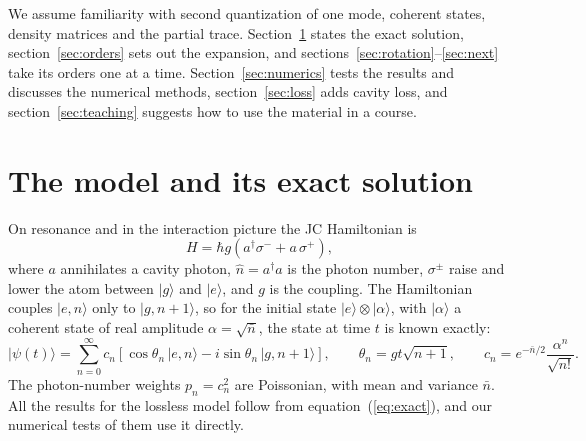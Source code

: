 \documentclass{iopjournal}
\newcommand{\nbar}{\bar{n}}
\newcommand{\ket}[1]{|#1\rangle}
\begin{document}
We assume familiarity with second quantization of one mode, coherent states, density matrices and the partial trace. Section~\ref{sec:model} states the exact solution, section~\ref{sec:orders} sets out the expansion, and sections~\ref{sec:rotation}--\ref{sec:next} take its orders one at a time. Section~\ref{sec:numerics} tests the results and discusses the numerical methods, section~\ref{sec:loss} adds cavity loss, and section~\ref{sec:teaching} suggests how to use the material in a course.

\section{The model and its exact solution}
\label{sec:model}

On resonance and in the interaction picture the JC Hamiltonian is
\begin{equation}
H = \hbar g\left(a^\dagger\sigma^- + a\,\sigma^+\right),
\label{eq:H}
\end{equation}
where $a$ annihilates a cavity photon, $\hat{n} = a^\dagger a$ is the photon number, $\sigma^\pm$ raise and lower the atom between $\ket{g}$ and $\ket{e}$, and $g$ is the coupling. The Hamiltonian couples $\ket{e,n}$ only to $\ket{g,n+1}$, so for the initial state $\ket{e}\otimes\ket{\alpha}$, with $\ket{\alpha}$ a coherent state of real amplitude $\alpha = \sqrt{\nbar}$, the state at time $t$ is known exactly:
\begin{equation}
\ket{\psi(t)} = \sum_{n=0}^{\infty} c_n\left[\cos\theta_n\,\ket{e,n} - i\sin\theta_n\,\ket{g,n+1}\right],\qquad \theta_n = gt\sqrt{n+1},\qquad c_n = e^{-\nbar/2}\frac{\alpha^n}{\sqrt{n!}}.
\label{eq:exact}
\end{equation}
The photon-number weights $p_n = c_n^2$ are Poissonian, with mean and variance $\nbar$. All the results for the lossless model follow from equation~(\ref{eq:exact}), and our numerical tests of them use it directly.
\end{document}

